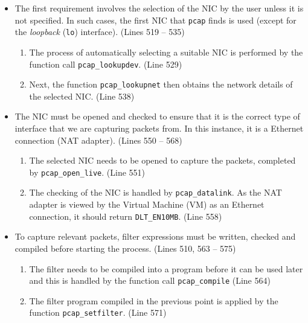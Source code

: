\documentclass[a4paper,12pt]{article}
\begin{document}
\begin{itemize}
	\itemsep0em
	\item The first requirement involves the selection of the NIC by the user unless it is not specified. In such cases, the first NIC that \texttt{pcap} finds is used (except for the \textit{loopback} (\texttt{lo}) interface). (Lines 519 -- 535)
	\begin{enumerate}
	\item The process of automatically selecting a suitable NIC is performed by the function call \texttt{pcap\_lookupdev}. (Line 529)
	\item Next, the function \texttt{pcap\_lookupnet} then obtains the network details of the selected NIC. (Line 538)
	\end{enumerate}
			\item The NIC must be opened and checked to ensure that it is the correct type of interface that we are capturing packets from. In this instance, it is a Ethernet connection (NAT adapter). (Lines 550 -- 568)
	\begin{enumerate}

	\item The selected NIC needs to be opened to capture the packets, completed by \texttt{pcap\_open\_live}. (Line 551)
	\item The checking of the NIC is handled by \texttt{pcap\_datalink}. As the NAT adapter is viewed by the Virtual Machine (VM) as an Ethernet connection, it should return \texttt{DLT\_EN10MB}. (Line 558)

		\end{enumerate}
		\item To capture relevant packets, filter expressions must be written, checked and compiled before starting the process. (Lines 510, 563 -- 575)
		\begin{enumerate}
		
	\item The filter needs to be compiled into a program before it can be used later and this is handled by the function call \texttt{pcap\_compile} (Line 564)
	\item The filter program compiled in the previous point is applied by the function \texttt{pcap\_setfilter}. (Line 571)
	\end{enumerate}



\end{itemize}
\end{document}
